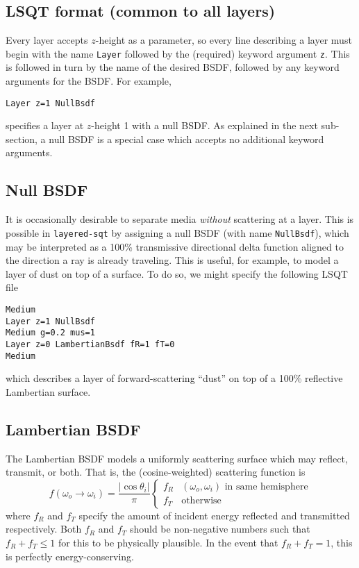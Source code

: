 \documentclass[
    twoside,
    twocolumn,
    letterpaper,
    defaultfont,
    rmheading,
    10pt]{article}
\begin{document}
\subsection{LSQT format (common to all layers)}

Every layer accepts $z$-height as a parameter, so every line describing a 
layer must begin with the name \texttt{Layer} followed by the (required) 
keyword argument \texttt{z}. This is followed in turn by the name of the 
desired BSDF, followed by any keyword arguments for the BSDF. For example,
\begin{verbatim}
Layer z=1 NullBsdf
\end{verbatim}
specifies a layer at $z$-height 1 with a null BSDF. As explained in 
the next sub-section, a null BSDF is a special case which accepts no additional
keyword arguments.


\subsection{Null BSDF}

It is occasionally desirable to separate media 
\emph{without} scattering at a layer. This is possible in
\texttt{layered-sqt} by assigning a null BSDF (with name 
\texttt{NullBsdf}), which may be interpreted as a 100\% transmissive 
directional delta function aligned to the direction a ray is already 
traveling. This is useful, for example, to model a layer of dust on 
top of a surface. To do so, we might specify the following
LSQT file
\begin{verbatim}
Medium
Layer z=1 NullBsdf
Medium g=0.2 mus=1
Layer z=0 LambertianBsdf fR=1 fT=0
Medium
\end{verbatim}
which describes a layer of forward-scattering ``dust'' on top 
of a 100\% reflective Lambertian surface.

\subsection{Lambertian BSDF}

The Lambertian BSDF models a uniformly scattering surface which 
may reflect, transmit, or both. That is, the (cosine-weighted)
scattering function is
\begin{equation*}
    f(\omega_o\to\omega_i) =
    \frac{|\cos{\theta_i}|}{\pi}
    \begin{cases}
        f_R & \text{$(\omega_o, \omega_i)$ in same hemisphere}\\
        f_T & \text{otherwise}
    \end{cases}
\end{equation*}
where $f_R$ and $f_T$ specify the amount of incident energy 
reflected and transmitted respectively. Both $f_R$ and $f_T$ should
be non-negative numbers such that $f_R + f_T \le 1$ for this to be
physically plausible. In the event that $f_R + f_T = 1$, this is
perfectly energy-conserving.
\end{document}
